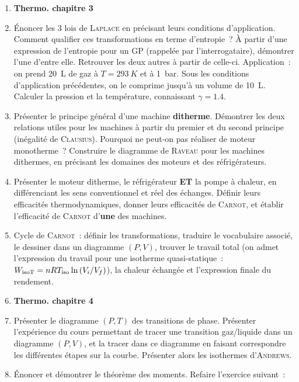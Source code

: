\documentclass[a4paper, 11pt, final, garamond]{book}
\begin{document}
\begin{enumerate}[label=\sqenumi]
    \item[] \textbf{Thermo. chapitre 3}

    \item Énoncer les 3 lois de \textsc{Laplace} en précisant leurs conditions
      d'application. Comment qualifier ces transformations en terme d'entropie~?
      À partir d'une expression de l'entropie pour un GP (rappelée par
      l'interrogataire), démontrer l'une d'entre elle. Retrouver les deux autres
      à partir de celle-ci. Application~: on prend \SI{20}{L} de gaz à $T =
      \SI{293}{K}$ et à \SI{1}{bar}. Sous les conditions d'application
      précédentes, on le comprime jusqu'à un volume de \SI{10}{L}. Calculer la
      pression et la température, connaissant $\gamma = \num{1.4}$.

    \item Présenter le principe général d'une machine \textbf{ditherme}.
      Démontrer les deux relations utiles pour les machines à partir du premier
      et du second principe (inégalité de \textsc{Clausius}). Pourquoi ne
      peut-on pas réaliser de moteur monotherme~? Construire le diagramme de
      \textsc{Raveau} pour les machines dithermes, en précisant les domaines des
      moteurs et des réfrigérateurs.

    \item Présenter le moteur ditherme, le réfrigérateur \textbf{ET} la pompe à
      chaleur, en différenciant les sens conventionnel et réel des échanges.
      Définir leurs efficacités thermodynamiques, donner leurs efficacités de
      \textsc{Carnot}, et établir l'efficacité de \textsc{Carnot} d'\textbf{une}
      des machines.

    \item Cycle de \textsc{Carnot}~: définir les transformations, traduire le
      vocabulaire associé, le dessiner dans un diagramme $(P,V)$, trouver le
      travail total (on admet l'expression du travail pour une isotherme
      quasi-statique~: $W_{\rm isoT} = nRT_{\rm iso} \ln \left(
      V_{i}/V_{f} \right)$), la chaleur échangée et l'expression finale
      du rendement.

    \item[] \textbf{Thermo. chapitre 4}
    \item Présenter le diagramme $(P,T)$ des transitions de phase. Présenter
      l'expérience du cours permettant de tracer une transition gaz/liquide dans
      un diagramme $(P,V)$, et la tracer dans ce diagramme en faisant
      correspondre les différentes étapes sur la courbe. Présenter alors les
      isothermes d'\textsc{Andrews}.

    \item Énoncer et démontrer le théorème des moments. Refaire l'exercice
      suivant~:
\end{enumerate}
\end{document}
